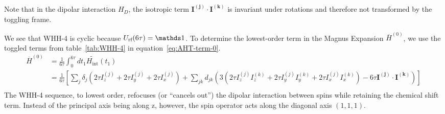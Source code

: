 Note that in the dipolar interaction $H_D$, the isotropic term $\mathbf{I^{(j)}} \cdot \mathbf{I^{(k)}}$ is invariant under rotations and therefore not transformed by the toggling frame.

We see that WHH-4 is cyclic because $U_{\text{rf}}(6\tau) = \identity$. To determine the lowest-order term in the Magnus Expansion $\overline{H}^{(0)}$, we use the toggled terms from table~\ref{tab:WHH-4} in equation~\ref{eq:AHT-term-0}.
\begin{align*}
    \overline{H}^{(0)} &= \frac{1}{6\tau} \int_0^{6\tau} dt_1
    \widetilde{H_{\text{int}}}(t_1) \\
    &= \frac{1}{6\tau} \left[
        \sum_j \delta_j \left(2\tau I_z^{(j)} + 2\tau I_y^{(j)} + 2\tau I_x^{(j)} \right) +
        \sum_{jk} d_{jk} \left(3(
            2\tau I_z^{(j)}I_z^{(k)} + 2\tau I_y^{(j)}I_y^{(k)} + 2\tau I_x^{(j)}I_x^{(k)}
        ) - 6\tau \mathbf{I^{(j)}} \cdot \mathbf{I^{(k)}} \right)
    \right] \\
\end{align*}
The WHH-4 sequence, to lowest order, refocuses (or ``cancels out'') the dipolar interaction between spins while retaining the chemical shift term. Instead of the principal axis being along z, however, the spin operator acts along the diagonal axis $(1,1,1)$.



%
%





